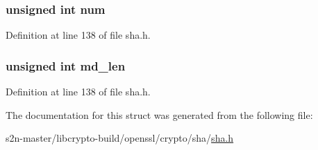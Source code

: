 \subsubsection[{\texorpdfstring{num}{num}}]{\setlength{\rightskip}{0pt plus 5cm}unsigned int num}\hypertarget{struct_s_h_a256state__st_a41ddefd3473727cad32a9767c10faed8}{}\label{struct_s_h_a256state__st_a41ddefd3473727cad32a9767c10faed8}


Definition at line 138 of file sha.\+h.

\subsubsection[{\texorpdfstring{md\+\_\+len}{md_len}}]{\setlength{\rightskip}{0pt plus 5cm}unsigned int md\+\_\+len}\hypertarget{struct_s_h_a256state__st_a0d87e60065bbf0161a8587c011168d6c}{}\label{struct_s_h_a256state__st_a0d87e60065bbf0161a8587c011168d6c}


Definition at line 138 of file sha.\+h.



The documentation for this struct was generated from the following file\+:\begin{DoxyCompactItemize}
\item 
s2n-\/master/libcrypto-\/build/openssl/crypto/sha/\hyperlink{crypto_2sha_2sha_8h}{sha.\+h}\end{DoxyCompactItemize}

